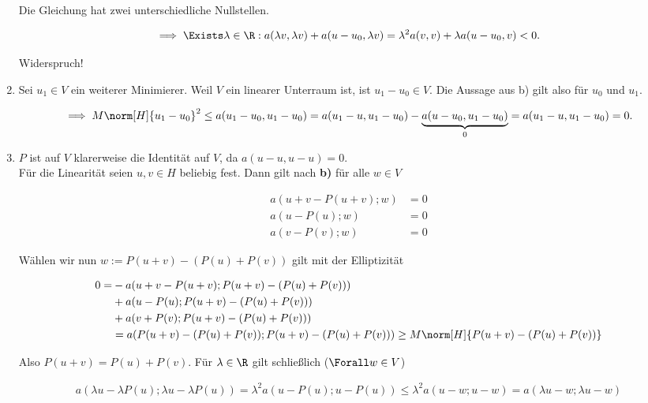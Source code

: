 \begin{solution}
\begin{enumerate}[label = \textbf{\alph*)}]
  Die Gleichung hat zwei unterschiedliche Nullstellen.

  \begin{align*}
    \implies
    \Exists \lambda \in \R:
    a(\lambda v, \lambda v) + a(u - u_0, \lambda v)
    =
    \lambda^2 a(v,v) + \lambda a(u - u_0, v) < 0.
  \end{align*}

  Widerspruch!

  \item Sei $u_1 \in V$ ein weiterer Minimierer.
  Weil $V$ ein linearer Unterraum ist, ist $u_1 - u_0 \in V$.
  Die Aussage aus b) gilt also für $u_0$ und $u_1$.

  \begin{align*}
    \implies
    M \norm[H]{u_1 - u_0}^2
    \leq
    a(u_1 - u_0, u_1 - u_0)
    =
    a(u_1 - u, u_1 - u_0)
    -
    \underbrace{a(u - u_0, u_1 - u_0)}_0
    =
    a(u_1 - u, u_1 - u_0) = 0.
  \end{align*}

  \item $P$ ist auf $V$ klarerweise die Identität auf $V$, da $a(u - u, u - u) = 0$. \\
  Für die Linearität seien $u, v \in H$ beliebig fest. Dann gilt nach \textbf{b)} für alle $w \in V$

    \begin{align*}
      a(u + v - P(u+v); w) &= 0 \\
      a(u - P(u); w) &= 0 \\
      a(v - P(v); w) &= 0
    \end{align*}

  Wählen wir nun $w := P(u + v) - (P(u) + P(v))$ gilt mit der Elliptizität

  \begin{align*}
    0
    =
    &- a(u + v - P(u + v);P(u + v) - (P(u) + P(v))) \\
    &+ a(u - P(u);P(u + v) - (P(u) + P(v))) \\
    &+ a(v + P(v);P(u + v) - (P(u) + P(v))) \\
    &=
    a(P(u + v) - (P(u) + P(v));P(u + v) - (P(u) + P(v)))
    \geq
    M \norm[H]{P(u + v) - (P(u) + P(v))}
  \end{align*}

  Also $P(u + v) = P(u) + P(v)$. Für $\lambda \in \R$ gilt schließlich ($\Forall w \in V$)

  \begin{align*}
    a(\lambda u - \lambda P(u);\lambda u - \lambda P(u))
    =
    \lambda^2 a(u - P(u);u - P(u))
    \leq
    \lambda^2 a(u - w; u - w)
    =
    a(\lambda u - w; \lambda u - w)
  \end{align*}


\end{enumerate}
\end{solution}
